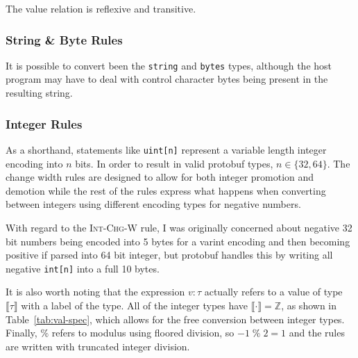 \documentclass[11pt]{article}
\theoremstyle{definition}
\theoremstyle{plain}
\renewcommand{\mod}{\;\%\;}
\begin{document}
The value relation is reflexive and transitive.

\begin{mathpar}

\end{mathpar}

\subsubsection{String \& Byte Rules}

It is possible to convert been the \texttt{string} and \texttt{bytes} types,
although the host program may have to deal with control character bytes being
present in the resulting string.

\begin{mathpar}

\end{mathpar}

\subsubsection{Integer Rules}

As a shorthand, statements like \texttt{uint[n]} represent a variable length
integer encoding into $n$ bits. In order to result in valid protobuf types, $n \in
\{32, 64\}$. The change width rules are designed to allow for both integer
promotion and demotion while the rest of the rules express what happens when
converting between integers using different encoding types for negative numbers.

With regard to the \textsc{Int-Chg-W} rule, I was originally concerned about
negative 32 bit numbers being encoded into 5 bytes for a varint encoding and
then becoming positive if parsed into 64 bit integer, but protobuf handles this
by writing all negative \texttt{int[n]} into a full 10 bytes. 

It is also worth noting that the expression $v : \tau$ actually refers to a value
of type $\llbracket \tau \rrbracket$ with a label of the type. All of the integer
types have $\llbracket \cdot \rrbracket = \mathbb{Z}$, as shown in Table~\ref{tab:val-spec},
which allows for the free conversion between integer types. Finally, $\%$ refers
to modulus using floored division, so $-1 \mod 2 = 1$ and the rules are
written with truncated integer division.
\end{document}
